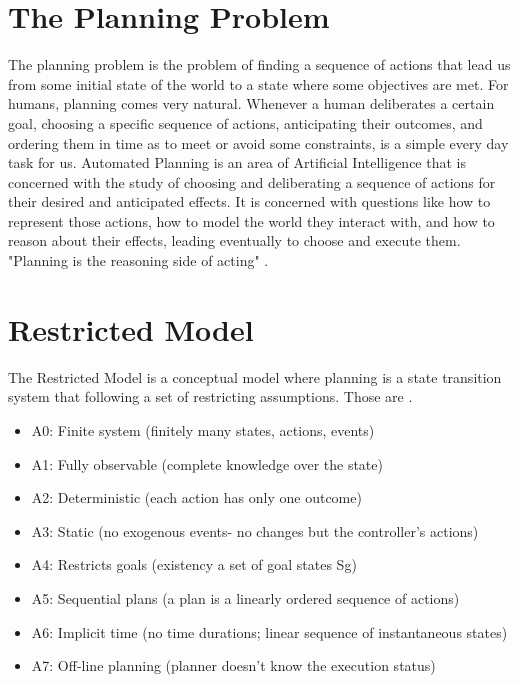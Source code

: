 \documentclass
[a4paper
,english
,parskip=half
,bibliography=totoc
]{scrreprt}
\begin{document}
    \section{The Planning Problem} \label{the_planning_problem}
    The planning problem is the problem of finding a sequence of actions that lead us from some initial state of the world to a state where some objectives are met. For humans, planning comes very natural. Whenever a human deliberates a certain goal, choosing a specific sequence of actions, anticipating their outcomes, and ordering them in time as to meet or avoid some constraints, is a simple every day task for us. Automated Planning is an area of Artificial Intelligence that is concerned with the study of choosing and deliberating a sequence of actions for their desired and anticipated effects. It is concerned with questions like how to represent those actions, how to model the world they interact with, and how to reason about their effects, leading eventually to choose and execute them.
    "Planning is the reasoning side of acting" \citep{automated_planning}.

    \section{Restricted Model}
    The Restricted Model is a conceptual model where planning is a state transition system that following a set of restricting assumptions. Those are \citep{automated_planning}.
    \begin{itemize}
    \item A0: Finite system       (finitely many states, actions, events)
    \item A1: Fully observable    (complete knowledge over the state)
    \item A2: Deterministic       (each action has only one outcome)
    \item A3: Static              (no exogenous events- no changes but the controller’s actions)
    \item A4: Restricts goals    (existency a set of goal states Sg)
    \item A5: Sequential plans    (a plan is a linearly ordered sequence of actions)
    \item A6: Implicit time       (no time durations; linear sequence of instantaneous states)
    \item A7: Off-line planning   (planner doesn’t know the execution status)
    \end{itemize}
\end{document}
